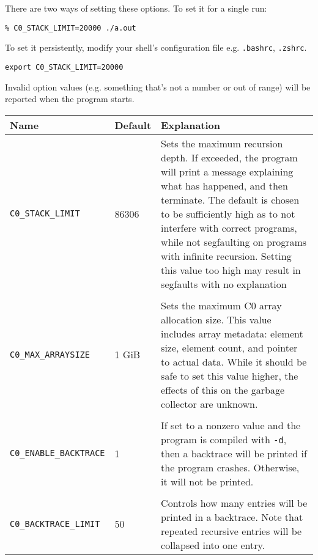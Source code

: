 \documentclass[11pt]{article}
\begin{document}
There are two ways of setting these options. To set it for a single run:
\begin{lstlisting}
% C0_STACK_LIMIT=20000 ./a.out
\end{lstlisting}
To set it persistently, modify your shell's configuration file e.g. \texttt{.bashrc}, \texttt{.zshrc}.
\begin{lstlisting}
export C0_STACK_LIMIT=20000
\end{lstlisting}
Invalid option values (e.g. something that's not a number or out of range) will be reported when the program starts.

\begin{center}
\begin{longtable}{llp{7cm}}
  Name & Default & Explanation \\
  \hline
  \rule{0pt}{\normalbaselineskip}
  \texttt{C0\_STACK\_LIMIT} & 86306 & Sets the maximum recursion depth. If exceeded, the program will print a message explaining what has happened, and then terminate. The default is chosen to be sufficiently high as to not interfere with correct programs, while not segfaulting on programs with infinite recursion. Setting this value too high may result in segfaults with no explanation \\
  \\
  \texttt{C0\_MAX\_ARRAYSIZE} & 1 GiB & Sets the maximum C0 array allocation size. This value includes array metadata: element size, element count, and pointer to actual data. While it should be safe to set this value higher, the effects of this on the garbage collector are unknown. \\
  \\
  \texttt{C0\_ENABLE\_BACKTRACE} & 1 & If set to a nonzero value and the program is compiled with \texttt{-d}, then a backtrace will be printed if the program crashes. Otherwise, it will not be printed. \\
  \\
  \texttt{C0\_BACKTRACE\_LIMIT} & 50 & Controls how many entries will be printed in a backtrace. Note that repeated recursive entries will be collapsed into one entry.
\end{longtable}
\end{center}
\end{document}
